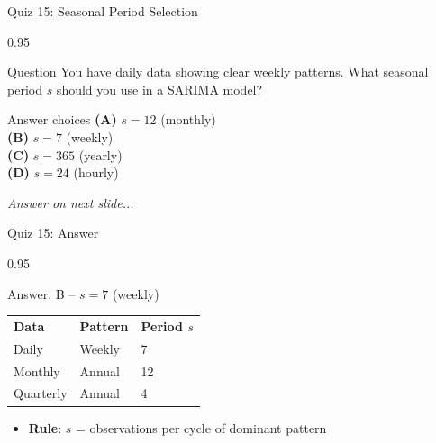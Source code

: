 \documentclass[9pt, aspectratio=169, t]{beamer}
\begin{document}
\begin{frame}{Quiz 15: Seasonal Period Selection}
    \begin{cminipage}{0.95\textwidth}
    \begin{alertblock}{Question}
        You have daily data showing clear weekly patterns. What seasonal period $s$ should you use in a SARIMA model?
    \end{alertblock}

    \vspace{0.4cm}

    \begin{block}{Answer choices}
        \textcolor{MainBlue}{\textbf{(A)}} $s = 12$ (monthly)\\[3pt]
        \textcolor{MainBlue}{\textbf{(B)}} $s = 7$ (weekly)\\[3pt]
        \textcolor{MainBlue}{\textbf{(C)}} $s = 365$ (yearly)\\[3pt]
        \textcolor{MainBlue}{\textbf{(D)}} $s = 24$ (hourly)
    \end{block}

    \vspace{0.5cm}

    \begin{center}
        \textit{Answer on next slide...}
    \end{center}
    \end{cminipage}
\end{frame}

\begin{frame}{Quiz 15: Answer}
    \begin{cminipage}{0.95\textwidth}
    \begin{exampleblock}{Answer: B -- $s = 7$ (weekly)}
        {\small
        \begin{center}
        \vspace{-0.2cm}
        \begin{tabular}{lll}
            \textbf{Data} & \textbf{Pattern} & \textbf{Period $s$} \\
            Daily & Weekly & 7 \\
            Monthly & Annual & 12 \\
            Quarterly & Annual & 4
        \end{tabular}
        \end{center}
        \vspace{-0.1cm}
        \begin{itemize}\setlength{\itemsep}{0pt}
            \item \textbf{Rule}: $s$ = observations per cycle of dominant pattern
        \end{itemize}
        }
    \end{exampleblock}

    \end{cminipage}
\end{frame}
\end{document}
